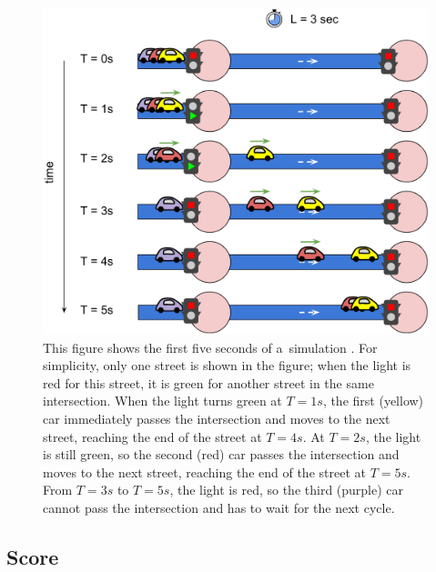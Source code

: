 \begin{figure}[ht] %
    \centering
    \includegraphics[width=\linewidth]{img/hashcode/figure3.png}
    \caption[Example of cars driving through a street]{
        This figure shows the first five seconds of a~simulation \cite{google_coding_competitions}.
        For simplicity, only one street is shown in the figure; when the light is red for this street, it is green for another street in the same intersection.
        When the light turns green at $T=1s$, the first (yellow) car immediately passes the intersection and moves to the next street, reaching the end of the street at $T=4s$.
        At $T=2s$, the light is still green, so the second (red) car passes the intersection and moves to the next street, reaching the end of the street at $T=5s$.
        From $T=3s$ to $T=5s$, the light is red, so the third (purple) car cannot pass the intersection and has to wait for the next cycle.
    }
    \label{fig:hashcode_street}
\end{figure}

\newpage

\subsection{Score}


